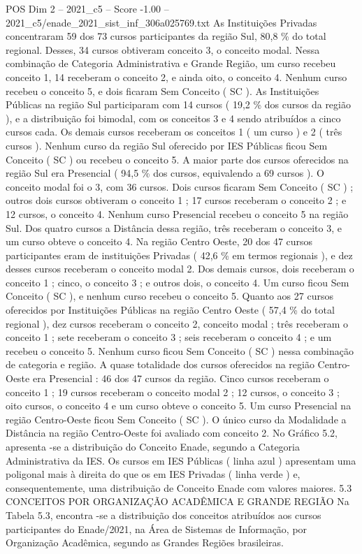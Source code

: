 \begin{textsample}{POS Dim 2 – 2021\_c5 – Score -1.00 – 2021\_c5/enade\_2021\_sist\_inf\_306a025769.txt}
As Instituições Privadas concentraram 59 dos 73 cursos participantes da região Sul, 80,8 \% do total regional.
Desses, 34 cursos obtiveram conceito 3, o conceito modal.
Nessa combinação de Categoria Administrativa e Grande Região, um curso recebeu conceito 1, 14 receberam o conceito 2, e ainda oito, o conceito 4.
Nenhum curso recebeu o conceito 5, e dois ficaram Sem Conceito ( SC ).
As Instituições Públicas na região Sul participaram com 14 cursos ( 19,2 \% dos cursos da região ), e a distribuição foi bimodal, com os conceitos 3 e 4 sendo atribuídos a cinco cursos cada.
Os demais cursos receberam os conceitos 1 ( um curso ) e 2 ( três cursos ).
Nenhum curso da região Sul oferecido por IES Públicas ficou Sem Conceito ( SC ) ou recebeu o conceito 5.
A maior parte dos cursos oferecidos na região Sul era Presencial ( 94,5 \% dos cursos, equivalendo a 69 cursos ).
O conceito modal foi o 3, com 36 cursos.
Dois cursos ficaram Sem Conceito ( SC ) ; outros dois cursos obtiveram o conceito 1 ; 17 cursos receberam o conceito 2 ; e 12 cursos, o conceito 4.
Nenhum curso Presencial recebeu o conceito 5 na região Sul.
Dos quatro cursos a Distância dessa região, três receberam o conceito 3, e um curso obteve o conceito 4.
Na região Centro Oeste, 20 dos 47 cursos participantes eram de instituições Privadas ( 42,6 \% em termos regionais ), e dez desses cursos receberam o conceito modal 2.
Dos demais cursos, dois receberam o conceito 1 ; cinco, o conceito 3 ; e outros dois, o conceito 4.
Um curso ficou Sem Conceito ( SC ), e nenhum curso recebeu o conceito 5.
Quanto aos 27 cursos oferecidos por Instituições Públicas na região Centro Oeste ( 57,4 \% do total regional ), dez cursos receberam o conceito 2, conceito modal ; três receberam o conceito 1 ; sete receberam o conceito 3 ; seis receberam o conceito 4 ; e um recebeu o conceito 5.
Nenhum curso ficou Sem Conceito ( SC ) nessa combinação de categoria e região.
A quase totalidade dos cursos oferecidos na região Centro-Oeste era Presencial : 46 dos 47 cursos da região.
Cinco cursos receberam o conceito 1 ; 19 cursos receberam o conceito modal 2 ; 12 cursos, o conceito 3 ; oito cursos, o conceito 4 e um curso obteve o conceito 5.
Um curso Presencial na região Centro-Oeste ficou Sem Conceito ( SC ).
O único curso da Modalidade a Distância na região Centro-Oeste foi avaliado com conceito 2.
No Gráfico 5.2, apresenta -se a distribuição do Conceito Enade, segundo a Categoria Administrativa da IES.
Os cursos em IES Públicas ( linha azul ) apresentam uma poligonal mais à direita do que os em IES Privadas ( linha verde ) e, consequentemente, uma distribuição de Conceito Enade com valores maiores. 5.3 CONCEITOS POR ORGANIZAÇÃO ACADÊMICA E GRANDE REGIÃO Na Tabela 5.3, encontra -se a distribuição dos conceitos atribuídos aos cursos participantes do Enade/2021, na Área de Sistemas de Informação, por Organização Acadêmica, segundo as Grandes Regiões brasileiras.

\end{textsample}
